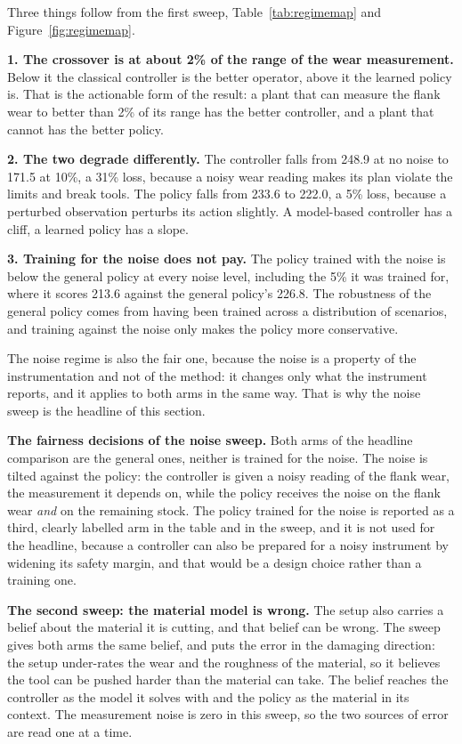\documentclass[11pt,a4paper]{article}
\begin{document}
Three things follow from the first sweep, Table~\ref{tab:regimemap} and Figure~\ref{fig:regimemap}.

\textbf{1. The crossover is at about 2\% of the range of the wear measurement.} Below it the classical controller is the better operator, above it the learned policy is. That is the actionable form of the result: a plant that can measure the flank wear to better than 2\% of its range has the better controller, and a plant that cannot has the better policy.

\textbf{2. The two degrade differently.} The controller falls from 248.9 at no noise to 171.5 at 10\%, a 31\% loss, because a noisy wear reading makes its plan violate the limits and break tools. The policy falls from 233.6 to 222.0, a 5\% loss, because a perturbed observation perturbs its action slightly. A model-based controller has a cliff, a learned policy has a slope.

\textbf{3. Training for the noise does not pay.} The policy trained with the noise is below the general policy at every noise level, including the 5\% it was trained for, where it scores 213.6 against the general policy's 226.8. The robustness of the general policy comes from having been trained across a distribution of scenarios, and training against the noise only makes the policy more conservative.

The noise regime is also the fair one, because the noise is a property of the instrumentation and not of the method: it changes only what the instrument reports, and it applies to both arms in the same way. That is why the noise sweep is the headline of this section.

\textbf{The fairness decisions of the noise sweep.} Both arms of the headline comparison are the general ones, neither is trained for the noise. The noise is tilted against the policy: the controller is given a noisy reading of the flank wear, the measurement it depends on, while the policy receives the noise on the flank wear \emph{and} on the remaining stock. The policy trained for the noise is reported as a third, clearly labelled arm in the table and in the sweep, and it is not used for the headline, because a controller can also be prepared for a noisy instrument by widening its safety margin, and that would be a design choice rather than a training one.

\textbf{The second sweep: the material model is wrong.} The setup also carries a belief about the material it is cutting, and that belief can be wrong. The sweep gives both arms the same belief, and puts the error in the damaging direction: the setup under-rates the wear and the roughness of the material, so it believes the tool can be pushed harder than the material can take. The belief reaches the controller as the model it solves with and the policy as the material in its context. The measurement noise is zero in this sweep, so the two sources of error are read one at a time.
\end{document}
